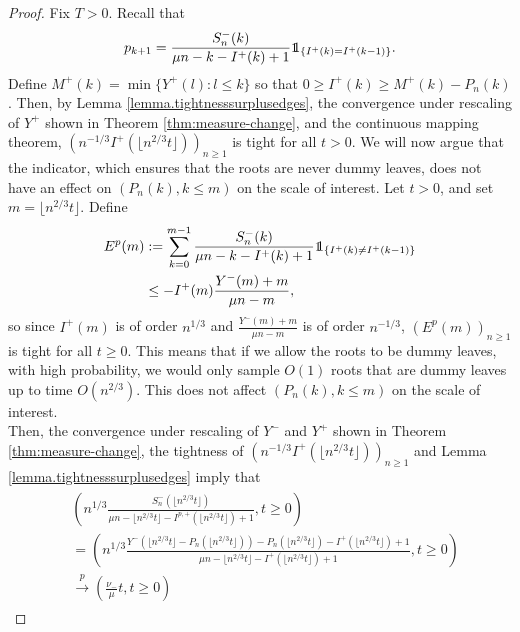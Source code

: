 \begin{proof}
Fix $T>0$. Recall that
$$p_{k+1}=\frac{S_n^{-}(k)}{\mu n - k -I^{+}(k)+1}\one_{\{I^{+}(k)=I^{+}(k-1)\}}.$$
Define $M^+(k)=\min\{Y^+(l):l\leq k\}$ so that $0\geq I^{+}(k)\geq M^+(k)-P_n(k)$.  Then, by Lemma \ref{lemma.tightnesssurplusedges}, the convergence under rescaling of $Y^+$ shown in Theorem \ref{thm:measure-change}, and the continuous mapping theorem, $\left(n^{-1/3}I^+(\lfloor n^{2/3} t \rfloor)\right)_{n\geq 1}$ is tight for all $t>0$.
We will now argue that the indicator, which ensures that the roots are never dummy leaves, does not have an effect on $(P_n(k),k\leq m)$ on the scale of interest. Let $t>0$, and set $m=\lfloor n^{2/3}t\rfloor$. Define
\begin{align*}\begin{split}
E^p(m)&:=\sum_{k=0}^{m-1}\frac{S_n^{-}(k)}{\mu n - k -I^{+}(k)+1}\one_{\{I^{+}(k)\neq I^{+}(k-1)\}}\\
&\leq -I^{+}(m) \frac{Y^-(m)+m}{\mu n - m},\end{split}\end{align*}
so since $I^{+}(m)$ is of order $n^{1/3}$ and $\frac{Y^{-}(m)+m}{\mu n - m}$ is of order $n^{-1/3}$, $(E^p(m))_{n\geq 1}$ is tight for all $t\geq 0$.  This means that if we allow the roots to be dummy leaves, with high probability, we would only sample $O(1)$ roots that are dummy leaves up to time $O(n^{2/3})$. This does not affect $(P_n(k),k\leq m)$ on the scale of interest. \\
 Then, the convergence under rescaling of $Y^-$ and $Y^+$ shown in Theorem \ref{thm:measure-change}, the tightness of $\left(n^{-1/3}I^{+}(\lfloor n^{2/3} t \rfloor)\right)_{n\geq 1}$ and Lemma \ref{lemma.tightnesssurplusedges} imply that
\begin{align}\begin{split}\label{eq.convergenceprob}
  &\left(n^{1/3}\frac{S_n^{-}\left(\lfloor n^{2/3} t \rfloor\right)}{\mu n - \lfloor n^{2/3} t \rfloor -I^{p,+}\left(\lfloor n^{2/3} t \rfloor\right)+1},t\geq 0\right)\\
 &=\left(n^{1/3}\frac{Y^-\left(\lfloor n^{2/3} t \rfloor-P_n\left(\lfloor n^{2/3} t \rfloor\right)\right)-P_n\left(\lfloor n^{2/3} t \rfloor\right)-I^{+}\left(\lfloor n^{2/3} t \rfloor\right)+1}{\mu n - \lfloor n^{2/3} t \rfloor -I^{+}\left(\lfloor n^{2/3} t \rfloor\right)+1},t\geq 0\right)\\
 &\overset{p}{\to} \left(\frac{\nu_-}{\mu}t,t\geq 0\right)\end{split}\end{align}

\end{proof}

